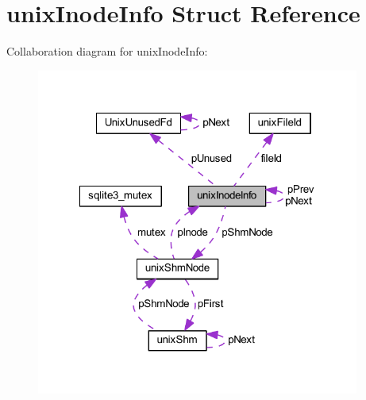 \hypertarget{structunix_inode_info}{\section{unix\-Inode\-Info Struct Reference}
\label{structunix_inode_info}
}


Collaboration diagram for unix\-Inode\-Info\-:\nopagebreak
\begin{figure}[H]
\begin{center}
\leavevmode
\includegraphics[width=301pt]{structunix_inode_info__coll__graph}
\end{center}
\end{figure}
